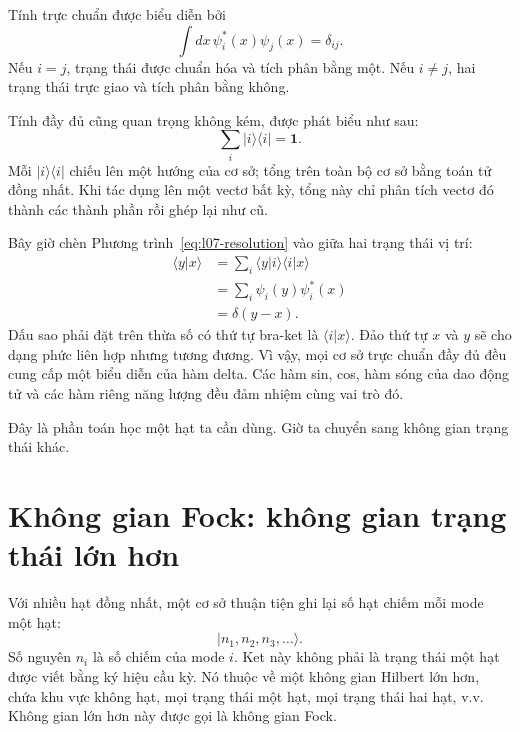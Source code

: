 Tính trực chuẩn được biểu diễn bởi
\begin{equation}
\int dx\,\psi_i^*(x)\psi_j(x)=\delta_{ij}.
\label{eq:l07-orthonormality}
\end{equation}
Nếu \(i=j\), trạng thái được chuẩn hóa và tích phân bằng một. Nếu \(i\ne j\), hai trạng thái trực giao và tích phân bằng không.

Tính đầy đủ cũng quan trọng không kém, được phát biểu như sau:
\begin{equation}
\sum_i |i\rangle\langle i|=\mathbf 1.
\label{eq:l07-resolution}
\end{equation}
Mỗi \(|i\rangle\langle i|\) chiếu lên một hướng của cơ sở; tổng trên toàn bộ cơ sở bằng toán tử đồng nhất. Khi tác dụng lên một vectơ bất kỳ, tổng này chỉ phân tích vectơ đó thành các thành phần rồi ghép lại như cũ.

Bây giờ chèn Phương trình~\eqref{eq:l07-resolution} vào giữa hai trạng thái vị trí:
\begin{align}
\langle y|x\rangle
&=\sum_i\langle y|i\rangle\langle i|x\rangle \\
&=\sum_i\psi_i(y)\psi_i^*(x) \\
&=\delta(y-x).
\label{eq:l07-position-completeness}
\end{align}
Dấu sao phải đặt trên thừa số có thứ tự bra-ket là \(\langle i|x\rangle\). Đảo thứ tự \(x\) và \(y\) sẽ cho dạng phức liên hợp nhưng tương đương. Vì vậy, mọi cơ sở trực chuẩn đầy đủ đều cung cấp một biểu diễn của hàm delta. Các hàm sin, cos, hàm sóng của dao động tử và các hàm riêng năng lượng đều đảm nhiệm cùng vai trò đó.

\begin{classroomqa}
\end{classroomqa}

Đây là phần toán học một hạt ta cần dùng. Giờ ta chuyển sang không gian trạng thái khác.

\section{Không gian Fock: không gian trạng thái lớn hơn}

Với nhiều hạt đồng nhất, một cơ sở thuận tiện ghi lại số hạt chiếm mỗi mode một hạt:
\begin{equation}
|n_1,n_2,n_3,\ldots\rangle.
\label{eq:l07-fock-basis}
\end{equation}
Số nguyên \(n_i\) là số chiếm của mode \(i\). Ket này không phải là trạng thái một hạt được viết bằng ký hiệu cầu kỳ. Nó thuộc về một không gian Hilbert lớn hơn, chứa khu vực không hạt, mọi trạng thái một hạt, mọi trạng thái hai hạt, v.v. Không gian lớn hơn này được gọi là không gian Fock.

